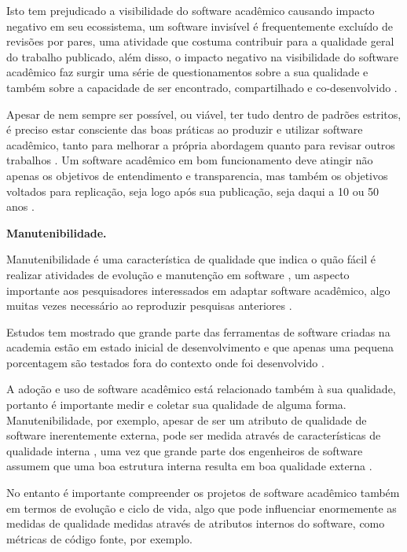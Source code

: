 \begin{description}
Isto tem prejudicado a visibilidade do software acadêmico causando impacto
negativo em seu ecossistema, um software invisível é frequentemente excluído de
revisões por pares, uma atividade que costuma contribuir para a qualidade geral
do trabalho publicado, além disso, o
impacto negativo na visibilidade do software acadêmico faz surgir uma
série de questionamentos sobre a sua qualidade e também sobre a
capacidade de ser encontrado, compartilhado e co-desenvolvido
\cite{howison2013incentives, katz2014transitive, howison2016software}.

Apesar de nem sempre ser possível, ou viável, ter tudo dentro de padrões
estritos, é preciso estar consciente das boas práticas ao produzir e utilizar
software acadêmico, tanto para melhorar a própria abordagem quanto para
revisar outros trabalhos \cite{wilson2014best}. Um software acadêmico em bom
funcionamento deve atingir não apenas os objetivos de entendimento e
transparencia, mas também os objetivos voltados para replicação,
seja logo após sua publicação, seja daqui a 10 ou 50 anos \cite{stodden2010reproducible}.

\item \textbf{Manutenibilidade.}

Manutenibilidade é uma característica de qualidade que indica o quão fácil é
realizar atividades de evolução e manutenção em software
\cite{kumar2012survey}, um aspecto importante aos pesquisadores interessados em
adaptar software acadêmico, algo muitas vezes necessário ao reproduzir
pesquisas anteriores \cite{peng2011reproducible}.

Estudos tem mostrado que grande parte das ferramentas de software criadas na
academia estão em estado inicial de desenvolvimento \cite{marshall2013tools} e
que apenas uma pequena porcentagem são testados fora do contexto onde foi
desenvolvido \cite{portillo2012tools}.

A adoção e uso de software acadêmico está relacionado também à sua qualidade,
portanto é importante medir e coletar sua qualidade de alguma forma.
Manutenibilidade, por exemplo, apesar de ser um atributo de qualidade de software
inerentemente externa, pode ser medida através de
características de qualidade interna \cite{hashim1996software,
dagpinar2003predicting}, uma vez que grande parte dos engenheiros de software
assumem que uma boa estrutura interna resulta em boa qualidade externa
\cite{fenton2014software}.

No entanto é importante compreender os projetos de software acadêmico também em
termos de evolução e ciclo de vida, algo que pode influenciar enormemente as
medidas de qualidade medidas através de atributos internos do software, como
métricas de código fonte, por exemplo. 

\end{description}
